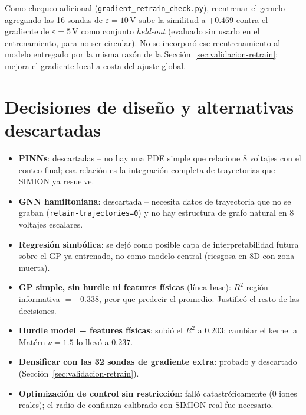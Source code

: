 \documentclass[11pt]{article}
\begin{document}
Como chequeo adicional (\texttt{gradient\_retrain\_check.py}), reentrenar el
gemelo agregando las 16 sondas de $\varepsilon=10\,$V sube la similitud a
$+0.469$ contra el gradiente de $\varepsilon=5\,$V como conjunto
\emph{held-out} (evaluado sin usarlo en el entrenamiento, para no ser
circular). No se incorporó ese reentrenamiento al modelo entregado por la
misma razón de la Sección~\ref{sec:validacion-retrain}: mejora el gradiente
local a costa del ajuste global.

\section{Decisiones de diseño y alternativas descartadas}

\begin{itemize}
  \item \textbf{PINNs}: descartadas -- no hay una PDE simple que relacione 8
  voltajes con el conteo final; esa relación es la integración completa de
  trayectorias que SIMION ya resuelve.
  \item \textbf{GNN hamiltoniana}: descartada -- necesita datos de trayectoria
  que no se graban (\texttt{retain-trajectories=0}) y no hay estructura de
  grafo natural en 8 voltajes escalares.
  \item \textbf{Regresión simbólica}: se dejó como posible capa de
  interpretabilidad futura sobre el GP ya entrenado, no como modelo central
  (riesgosa en 8D con zona muerta).
  \item \textbf{GP simple, sin hurdle ni features físicas} (línea base):
  $R^2$ región informativa $=-0.338$, peor que predecir el promedio.
  Justificó el resto de las decisiones.
  \item \textbf{Hurdle model + features físicas}: subió el $R^2$ a $0.203$;
  cambiar el kernel a Matérn $\nu=1.5$ lo llevó a $0.237$.
  \item \textbf{Densificar con las 32 sondas de gradiente extra}: probado y
  descartado (Sección~\ref{sec:validacion-retrain}).
  \item \textbf{Optimización de control sin restricción}: falló
  catastróficamente (0 iones reales); el radio de confianza calibrado con
  SIMION real fue necesario.
\end{itemize}

\end{document}
